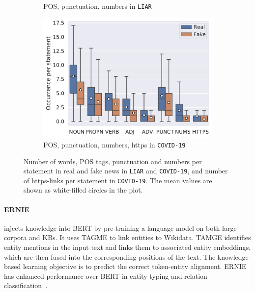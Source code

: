 \documentclass[letterpaper]{article} %
\begin{document}
\begin{figure}
{\begin{subfigure}[b]{0.345\textwidth}
\caption{POS, punctuation, numbers in \texttt{LIAR}}
\label{fig:liarPos}
\end{subfigure}
\hfill
\begin{subfigure}[b]{0.38\textwidth}
\centering
\includegraphics[width=\textwidth]{imgs/covid_plot.pdf}
\caption{POS, punctuation, numbers, https in \texttt{COVID-19}}
\label{fig:covidPos}
\end{subfigure}
}
\caption{Number of words, POS tags, punctuation and numbers per statement in real and fake news in \texttt{LIAR} and \texttt{COVID-19}, and
number of https-links per statement in \texttt{COVID-19}.
The mean values are shown as white-filled circles in the plot.}
\label{fig:box_plot}
\end{figure}


\paragraph{ERNIE} injects knowledge into BERT \cite{devlin-etal-2019-bert} by pre-training a language model on both large corpora and KBs. 
It uses TAGME \cite{Ferragina2010TAGMEOA} to link entities to Wikidata.
TAMGE identifies entity mentions in the input text and links them to associated entity embeddings, which are then fused into the corresponding positions of the text.
The knowledge-based learning objective is to predict the correct token-entity alignment. 
ERNIE has enhanced performance over BERT in entity typing and relation classification~\cite{zhang-etal-2019-ernie}. 
\end{document}
